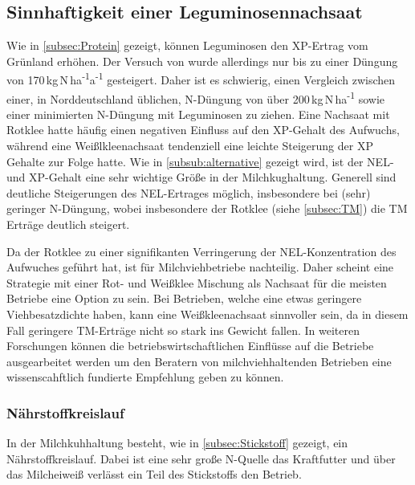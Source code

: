 \subsection{Sinnhaftigkeit einer Leguminosennachsaat}
\label{sub:leguminosen}
Wie in \cref{subsec:Protein} gezeigt, können Leguminosen den \ac{XP}-Ertrag vom Grünland erhöhen.
Der Versuch von \textcite{weggler2050leguminosen} wurde allerdings nur bis zu einer Düngung von 170\,kg\,N\,ha\textsuperscript{-1}a\textsuperscript{-1} gesteigert.
Daher ist es schwierig, einen Vergleich zwischen einer, in Norddeutschland üblichen, N-Düngung von über 200\,kg\,N\,ha\textsuperscript{-1} sowie einer minimierten N-Düngung mit Leguminosen zu ziehen.
Eine Nachsaat mit Rotklee hatte häufig einen negativen Einfluss auf den \ac{XP}-Gehalt des Aufwuchs, während eine Weißlkleenachsaat tendenziell eine leichte Steigerung der \ac{XP} Gehalte zur Folge hatte.
Wie in \cref{subsub:alternative} gezeigt wird, ist der \ac{NEL}- und \ac{XP}-Gehalt eine sehr wichtige Größe in der Milchkughaltung. 
Generell sind deutliche Steigerungen des \ac{NEL}-Ertrages möglich, insbesondere bei (sehr) geringer N-Düngung, wobei insbesondere der Rotklee (siehe \cref{subsec:TM}) die \ac{TM} Erträge deutlich steigert.

Da der Rotklee zu einer signifikanten Verringerung der \ac{NEL}-Konzentration des Aufwuches geführt hat, ist für Milchviehbetriebe nachteilig.
Daher scheint eine Strategie mit einer Rot- und Weißklee Mischung als Nachsaat für die meisten Betriebe eine Option zu sein.
Bei Betrieben, welche eine etwas geringere Viehbesatzdichte haben, kann eine Weißkleenachsaat sinnvoller sein, da in diesem Fall geringere \ac{TM}-Erträge nicht so stark ins Gewicht fallen.
In weiteren Forschungen können die betriebswirtschaftlichen Einflüsse auf die Betriebe ausgearbeitet werden um den Beratern von milchviehhaltenden Betrieben eine wissenscahftlich fundierte Empfehlung geben zu können.

\subsubsection{Nährstoffkreislauf}
\label{subsub:nährstoffkreislauf}

In der Milchkuhhaltung besteht, wie in \cref{subsec:Stickstoff} gezeigt, ein Nährstoffkreislauf.
Dabei ist eine sehr große N-Quelle das Kraftfutter und über das Milcheiweiß verlässt ein Teil des Stickstoffs  den Betrieb.

